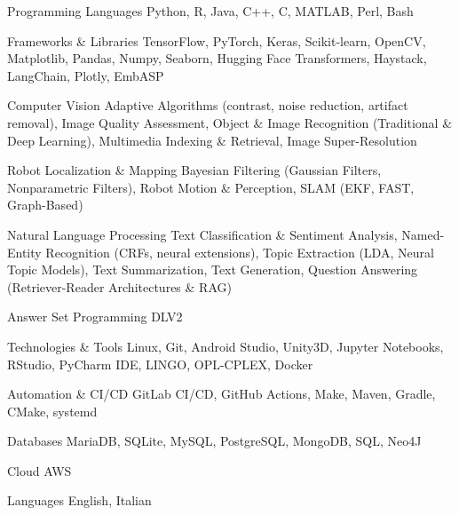 

\begin{cvskills}
    
\cvskill
{Programming Languages}
{Python, R, Java, C++, C, MATLAB, Perl, Bash}

\cvskill
{Frameworks \& Libraries}
{TensorFlow, PyTorch, Keras, Scikit-learn, OpenCV, Matplotlib, Pandas, Numpy, Seaborn, Hugging Face Transformers, Haystack, LangChain, Plotly, EmbASP}

\cvskill
{Computer Vision}
{Adaptive Algorithms (contrast, noise reduction, artifact removal), Image Quality Assessment, Object \& Image Recognition (Traditional \& Deep Learning), Multimedia Indexing \& Retrieval, Image Super-Resolution}

\cvskill
{Robot Localization \& Mapping}
{Bayesian Filtering (Gaussian Filters, Nonparametric Filters), Robot Motion \& Perception, SLAM (EKF, FAST, Graph-Based)}

\cvskill
{Natural Language Processing}
{Text Classification \& Sentiment Analysis, Named-Entity Recognition (CRFs, neural extensions), Topic Extraction (LDA, Neural Topic Models), Text Summarization, Text Generation, Question Answering (Retriever-Reader Architectures \& RAG)}

\cvskill
{Answer Set Programming}
{DLV2}

\cvskill
{Technologies \& Tools}
{Linux, Git, Android Studio, Unity3D, Jupyter Notebooks, RStudio, PyCharm IDE, LINGO, OPL-CPLEX, Docker}

\cvskill
{Automation \& CI/CD}
{GitLab CI/CD, GitHub Actions, Make, Maven, Gradle, CMake, systemd}

\cvskill
{Databases}
{MariaDB, SQLite, MySQL, PostgreSQL, MongoDB, SQL, Neo4J}

\cvskill
{Cloud}
{AWS}

\cvskill
{Languages}
{English, Italian}

\end{cvskills}
